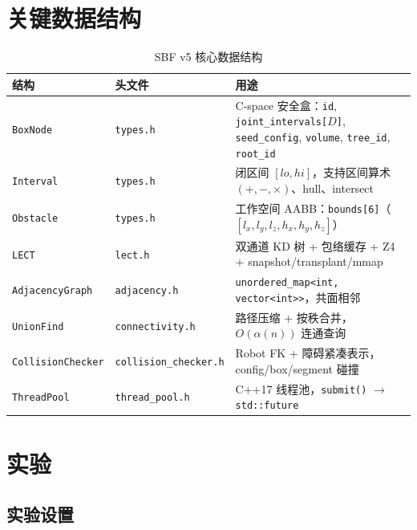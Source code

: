 \documentclass[11pt,a4paper]{article}
\begin{document}

\section{关键数据结构}
\label{sec:datastruct}

\begin{table}[ht]
\centering
\caption{SBF v5 核心数据结构}
\label{tab:datastruct}
\begin{tabularx}{\textwidth}{@{}llX@{}}
\toprule
\textbf{结构} & \textbf{头文件} & \textbf{用途} \\
\midrule
\texttt{BoxNode} & \texttt{types.h} & C-space 安全盒：\texttt{id}, \texttt{joint\_intervals[$D$]}, \texttt{seed\_config}, \texttt{volume}, \texttt{tree\_id}, \texttt{root\_id} \\
\texttt{Interval} & \texttt{types.h} & 闭区间 $[lo, hi]$，支持区间算术 $(+,-,\times)$、hull、intersect \\
\texttt{Obstacle} & \texttt{types.h} & 工作空间 AABB：\texttt{bounds[6]}（$[l_x, l_y, l_z, h_x, h_y, h_z]$） \\
\texttt{LECT} & \texttt{lect.h} & 双通道 KD 树 + 包络缓存 + Z4 + snapshot/transplant/mmap \\
\texttt{AdjacencyGraph} & \texttt{adjacency.h} & \texttt{unordered\_map<int, vector<int>{}>}，共面相邻 \\
\texttt{UnionFind} & \texttt{connectivity.h} & 路径压缩 + 按秩合并，$O(\alpha(n))$ 连通查询 \\
\texttt{CollisionChecker} & \texttt{collision\_checker.h} & Robot FK + 障碍紧凑表示，config/box/segment 碰撞 \\
\texttt{ThreadPool} & \texttt{thread\_pool.h} & C++17 线程池，\texttt{submit()} $\to$ \texttt{std::future} \\
\bottomrule
\end{tabularx}
\end{table}


\section{实验}
\label{sec:experiments}

\subsection{实验设置}
\end{document}
